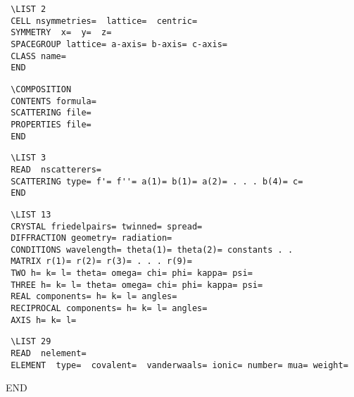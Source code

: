 \documentclass[10pt,a4paper]{report}
\begin{document}
\bigskip{}



\small\begin{verbatim}
 \LIST 2
 CELL nsymmetries=  lattice=  centric=
 SYMMETRY  x=  y=  z=
 SPACEGROUP lattice= a-axis= b-axis= c-axis=
 CLASS name=
 END
\end{verbatim}\normalsize




\bigskip{}



\small\begin{verbatim}
 \COMPOSITION
 CONTENTS formula=
 SCATTERING file=
 PROPERTIES file=
 END
\end{verbatim}\normalsize




\bigskip{}



\small\begin{verbatim}
 \LIST 3
 READ  nscatterers=
 SCATTERING type= f'= f''= a(1)= b(1)= a(2)= . . . b(4)= c=
 END
\end{verbatim}\normalsize




\bigskip{}



\small\begin{verbatim}
 \LIST 13
 CRYSTAL friedelpairs= twinned= spread=
 DIFFRACTION geometry= radiation=
 CONDITIONS wavelength= theta(1)= theta(2)= constants . .
 MATRIX r(1)= r(2)= r(3)= . . . r(9)=
 TWO h= k= l= theta= omega= chi= phi= kappa= psi=
 THREE h= k= l= theta= omega= chi= phi= kappa= psi=
 REAL components= h= k= l= angles=
 RECIPROCAL components= h= k= l= angles=
 AXIS h= k= l=
\end{verbatim}\normalsize




\bigskip{}



\small\begin{verbatim}
 \LIST 29
 READ  nelement=
 ELEMENT  type=  covalent=  vanderwaals= ionic= number= mua= weight=\end{verbatim}\normalsize


 END
\end{document}
